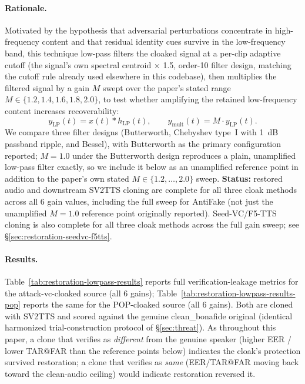 \documentclass[11pt]{article}
\begin{document}
\paragraph{Rationale.} Motivated by the hypothesis that adversarial
perturbations concentrate in high-frequency content and that residual
identity cues survive in the low-frequency band, this technique
low-pass filters the cloaked signal at a per-clip adaptive cutoff (the
signal's own spectral centroid $\times$ 1.5, order-10 filter design,
matching the cutoff rule already used elsewhere in this codebase), then
multiplies the filtered signal by a gain $M$ swept over the paper's
stated range $M \in \{1.2, 1.4, 1.6, 1.8, 2.0\}$, to test whether
amplifying the retained low-frequency content increases recoverability:
\[
y_{\mathrm{LP}}(t) = x(t) * h_{\mathrm{LP}}(t), \qquad
y_{\mathrm{mult}}(t) = M \cdot y_{\mathrm{LP}}(t).
\]
We compare three filter designs (Butterworth, Chebyshev type~I with
1~dB passband ripple, and Bessel), with Butterworth as the primary
configuration reported; $M=1.0$ under the Butterworth design reproduces
a plain, unamplified low-pass filter exactly, so we include it below as
an unamplified reference point in addition to the paper's own stated
$M \in \{1.2,\ldots,2.0\}$ sweep. \textbf{Status:} restored audio and
downstream SV2TTS cloning are complete for all three cloak methods
across all 6 gain values, including the full sweep for AntiFake (not
just the unamplified $M=1.0$ reference point originally reported).
Seed-VC/F5-TTS cloning is also complete for all three cloak methods
across the full gain sweep; see \S\ref{sec:restoration-seedvc-f5tts}.

\paragraph{Results.} Table~\ref{tab:restoration-lowpass-results} reports
full verification-leakage metrics for the attack-vc-cloaked source
(all 6 gains); Table~\ref{tab:restoration-lowpass-results-pop} reports
the same for the POP-cloaked source (all 6 gains). Both are
cloned with SV2TTS and scored against the genuine clean\_bonafide
original (identical harmonized trial-construction protocol of
\S\ref{sec:threat}). As throughout this paper, a clone that verifies as
\emph{different} from the genuine speaker (higher EER / lower TAR@FAR
than the reference points below) indicates the cloak's protection
survived restoration; a clone that verifies as \emph{same} (EER/TAR@FAR
moving back toward the clean-audio ceiling) would indicate restoration
reversed it.
\end{document}
